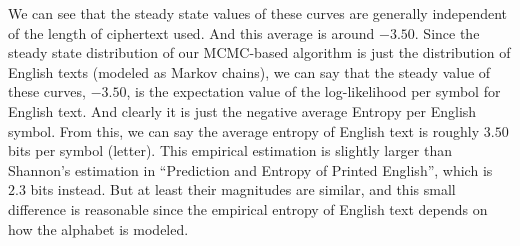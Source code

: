 \documentclass[12pt,aps,pre,reprint]{revtex4-1}
\begin{document}
We can see that the steady state values of these curves are generally independent of the length of ciphertext used. And this average is around $-3.50$. Since the steady state distribution of our MCMC-based algorithm is just the distribution of English texts (modeled as Markov chains), we can say that the steady value of these curves, $-3.50$, is the expectation value of the log-likelihood per symbol for English text. And clearly it is just the negative average Entropy per English symbol. From this, we can say the average entropy of English text is roughly $3.50$ bits per symbol (letter). This empirical estimation is slightly larger than Shannon's estimation in “Prediction and Entropy of Printed English”, which is $2.3$ bits instead. But at least their magnitudes are similar, and this small difference is reasonable since the empirical entropy of English text depends on how the alphabet is modeled.
\end{document}
